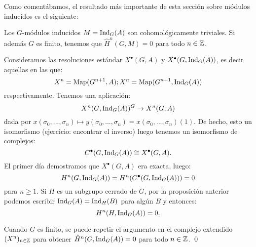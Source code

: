 \documentclass[a4paper,12pt, leqno]{article}
\begin{document}
Como comentábamos, el resultado más importante de esta sección sobre módulos inducidos es el siguiente:
\begin{prop}
	Los $G$-módulos inducidos $M=\mathrm{Ind}_G (A)$ son cohomológicamente triviales. Si además $G$ es finito, tenemos que $\hat{H}^n(G,M)=0$ para todo $n \in \mathbb{Z}$.
\end{prop}
\begin{dem}
	Consideramos las resoluciones estándar $X^{\bullet}(G,A)$ y $X^{\bullet}(G,\mathrm{Ind}_G (A))$, es decir aquellas en las que:
	\begin{equation*}
	X^n=\mathrm{Map}(G^{n+1},A);X^n=\mathrm{Map}(G^{n+1},\mathrm{Ind}_G (A))
	\end{equation*}
	 respectivamente. Tenemos una aplicación:
	 \begin{equation*}
	 X^n(G,\mathrm{Ind}_G (A))^G \rightarrow X^n(G,A)
	 \end{equation*}
	 dada por $x(\sigma_0,...,\sigma_n)\mapsto y(\sigma_0,...,\sigma_n)=x(\sigma_0,...,\sigma_n)(1)$. De hecho, esto un isomorfismo (ejercicio: encontrar el inverso) luego tenemos un isomorfismo de complejos:
	 \begin{equation*}
	 C^{\bullet}(G,\mathrm{Ind}_G (A))\cong X^{\bullet}(G,A).
	 \end{equation*}
	 El primer día demostramos que $X^{\bullet}(G,A)$ era exacta, luego:
	 \begin{equation*}
	 H^n(G,\mathrm{Ind}_G (A))=H^n(C^{\bullet}(G,\mathrm{Ind}_G (A)))=0
	 \end{equation*}
	 para $n\geq 1$. Si $H$ es  un subgrupo cerrado de $G$, por la proposición anterior podemos escribir $\mathrm{Ind}_G (A)=\mathrm{Ind}_H(B)$ para algún $B$ y entonces: 
	 \begin{equation*}
	 H^n(H,\mathrm{Ind}_G (A))=0.
	 \end{equation*}
	 
	 Cuando $G$ es finito, se puede repetir el argumento en el complejo extendido $(X^n)_{n \in \mathbb{Z}}$ para obtener $\hat{H}^n(G, \mathrm{Ind}_G (A))=0$ para todo $n \in \mathbb{Z}$. \qed
\end{dem}
\end{document}
